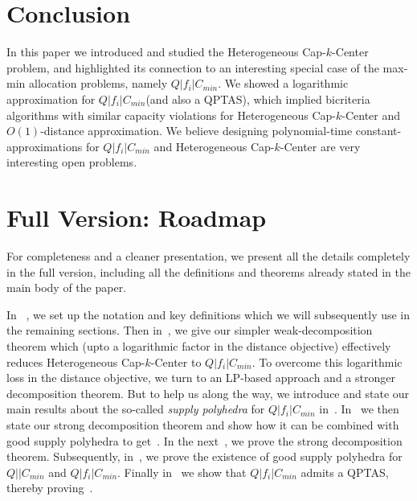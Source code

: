 \documentclass{llncs}
\def\mckc{{\sffamily Heterogeneous Cap-$k$-Center}\xspace}
\def\cckp{$Q|f_i|C_{min}$\xspace}
\begin{document}
\section{Conclusion}
In this paper we introduced and studied the \mckc problem, and highlighted its connection to an interesting special case of the max-min allocation problems, namely \cckp. We showed a logarithmic approximation for \cckp (and also a QPTAS), which implied bicriteria algorithms with similar capacity violations for \mckc and $O(1)$-distance approximation. We believe designing polynomial-time constant-approximations for \cckp and \mckc are very interesting open problems.



\newpage
\appendix

\section{Full Version: Roadmap}
For completeness and a cleaner presentation, we present all the details completely in the full version, including all the definitions and theorems already stated in the main body of the paper.


In ~, we set up the notation and key definitions which we will subsequently use in the remaining sections. Then in~, we give our simpler weak-decomposition theorem which (upto a logarithmic factor in the distance objective) effectively reduces \mckc to \cckp. To overcome this logarithmic loss in the distance objective, we turn to an LP-based approach and a stronger decomposition theorem. But to help us along the way, we introduce and state our main results about the so-called \emph{supply polyhedra} for \cckp in~. In~ we then state our strong decomposition theorem and show how it can be combined with good supply polyhedra to get~. In the next~, we prove the strong decomposition theorem. Subsequently, in~, we prove the existence of good supply polyhedra for $Q || C_{min}$ and \cckp. Finally in~ we show that \cckp admits a QPTAS, thereby proving~.


%








\end{document}
